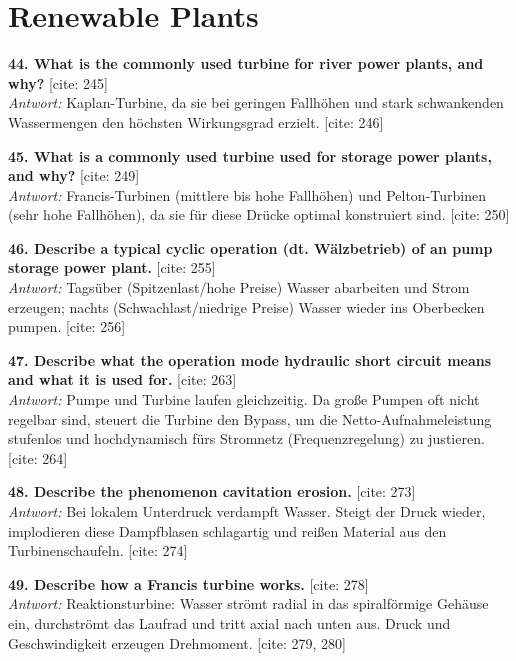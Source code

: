 \documentclass[11pt,a4paper]{article}
\begin{document}
\section*{Renewable Plants}

\textbf{44. What is the commonly used turbine for river power plants, and why?} [cite: 245]\\
\textit{Antwort:} Kaplan-Turbine, da sie bei geringen Fallhöhen und stark schwankenden Wassermengen den höchsten Wirkungsgrad erzielt. [cite: 246]

\vspace{0.5cm}
\textbf{45. What is a commonly used turbine used for storage power plants, and why?} [cite: 249]\\
\textit{Antwort:} Francis-Turbinen (mittlere bis hohe Fallhöhen) und Pelton-Turbinen (sehr hohe Fallhöhen), da sie für diese Drücke optimal konstruiert sind. [cite: 250]

\vspace{0.5cm}
\textbf{46. Describe a typical cyclic operation (dt. Wälzbetrieb) of an pump storage power plant.} [cite: 255]\\
\textit{Antwort:} Tagsüber (Spitzenlast/hohe Preise) Wasser abarbeiten und Strom erzeugen; nachts (Schwachlast/niedrige Preise) Wasser wieder ins Oberbecken pumpen. [cite: 256]

\vspace{0.5cm}
\textbf{47. Describe what the operation mode hydraulic short circuit means and what it is used for.} [cite: 263]\\
\textit{Antwort:} Pumpe und Turbine laufen gleichzeitig. Da große Pumpen oft nicht regelbar sind, steuert die Turbine den Bypass, um die Netto-Aufnahmeleistung stufenlos und hochdynamisch fürs Stromnetz (Frequenzregelung) zu justieren. [cite: 264]

\vspace{0.5cm}
\textbf{48. Describe the phenomenon cavitation erosion.} [cite: 273]\\
\textit{Antwort:} Bei lokalem Unterdruck verdampft Wasser. Steigt der Druck wieder, implodieren diese Dampfblasen schlagartig und reißen Material aus den Turbinenschaufeln. [cite: 274]

\vspace{0.5cm}
\textbf{49. Describe how a Francis turbine works.} [cite: 278]\\
\textit{Antwort:} Reaktionsturbine: Wasser strömt radial in das spiralförmige Gehäuse ein, durchströmt das Laufrad und tritt axial nach unten aus. Druck und Geschwindigkeit erzeugen Drehmoment. [cite: 279, 280]
\end{document}
